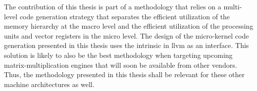 \documentclass[\main/thesis.tex]{subfiles}
\begin{document}
The contribution of this thesis is part of a methodology that relies on a multi-level code generation strategy that separates the efficient utilization of the memory hierarchy at the macro level and the efficient utilization of the processing units and vector registers in the micro level.
The design of the micro-kernel code generation presented in this thesis uses the  intrinsic in \gls{llvm} as an interface.
This solution is likely to also be the best methodology when targeting upcoming matrix-multiplication engines that will soon be available from other vendors.
Thus, the methodology presented in this thesis shall be relevant for these other machine architectures as well.
\end{document}
